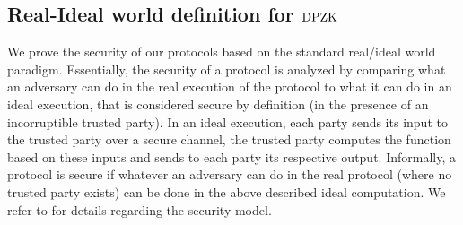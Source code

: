 \subsection{Real-Ideal world definition for $\text{DPZK}$}

We prove the security of our protocols based on the standard real/ideal world paradigm.  Essentially, the security of a protocol is analyzed by comparing what an adversary can do in the real execution of the protocol to what it can do in an ideal execution,  that is considered secure by definition (in the presence of an incorruptible trusted party). In an ideal execution, each party sends its input to the trusted party over a secure channel, the trusted party computes the function based on these inputs and sends to each party its respective output.  Informally, a protocol
is secure if whatever an adversary can do in the real protocol (where no trusted party exists) can be done in the above described ideal computation. We refer to \cite{Canetti00,Goldreich2001,Lindell17,CohenL14} for details regarding the security model.  


